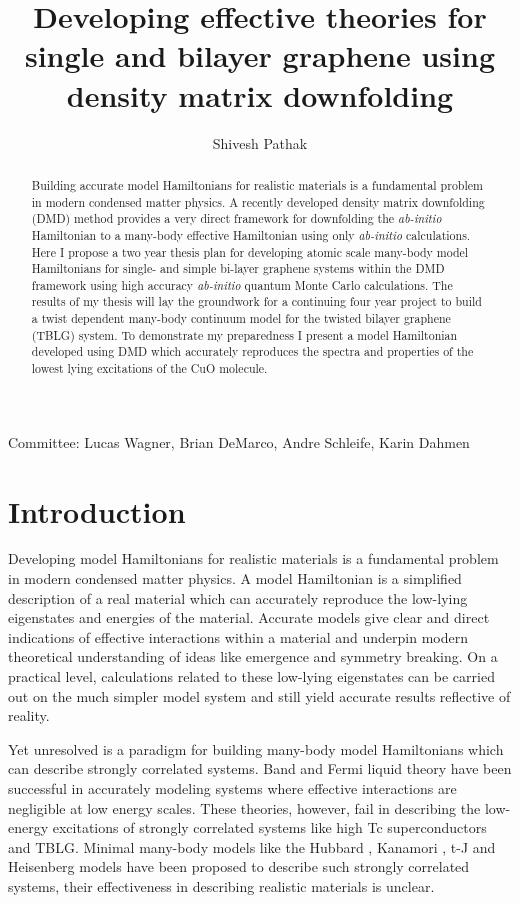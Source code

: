 \documentclass[12pt]{article}
\author{Shivesh Pathak}
\title{Developing effective theories for single and bilayer graphene using density matrix downfolding}
\begin{document}
\maketitle
\begin{abstract}
Building accurate model Hamiltonians for realistic materials is a fundamental problem in modern condensed matter physics.
A recently developed density matrix downfolding (DMD) \cite{Zheng2017} method provides a very direct framework for downfolding the \textit{ab-initio} Hamiltonian to a many-body effective Hamiltonian using only \textit{ab-initio} calculations. 
Here I propose a two year thesis plan for developing atomic scale many-body model Hamiltonians for single- and simple bi-layer graphene systems within the DMD framework using high accuracy \textit{ab-initio} quantum Monte Carlo calculations.
The results of my thesis will lay the groundwork for a continuing four year project to build a twist dependent many-body continuum model for the twisted bilayer graphene (TBLG) system.
To demonstrate my preparedness I present a model Hamiltonian developed using DMD which accurately reproduces the spectra and properties of the lowest lying excitations of the CuO molecule.
\end{abstract}
Committee: Lucas Wagner, Brian DeMarco, Andre Schleife, Karin Dahmen
\pagebreak

\section{Introduction}
Developing model Hamiltonians for realistic materials is a fundamental problem in modern condensed matter physics.
A model Hamiltonian is a simplified description of a real material which can accurately reproduce the low-lying eigenstates and energies of the material.
Accurate models give clear and direct indications of effective interactions within a material and underpin modern theoretical understanding of ideas like emergence and symmetry breaking.
On a practical level, calculations related to these low-lying eigenstates can be carried out on the much simpler model system and still yield accurate results reflective of reality.

Yet unresolved is a paradigm for building many-body model Hamiltonians which can describe strongly correlated systems.
Band and Fermi liquid theory have been successful in accurately modeling systems where effective interactions are negligible at low energy scales.
These theories, however, fail in describing the low-energy excitations of strongly correlated systems like high Tc superconductors and TBLG.
Minimal many-body models like the Hubbard \cite{Hubbard1963}, Kanamori \cite{10.1143/PTP.30.275}, t-J \cite{Chao_1977} and Heisenberg models have been proposed to describe such strongly correlated systems, their effectiveness in describing realistic materials is unclear.
\end{document}
